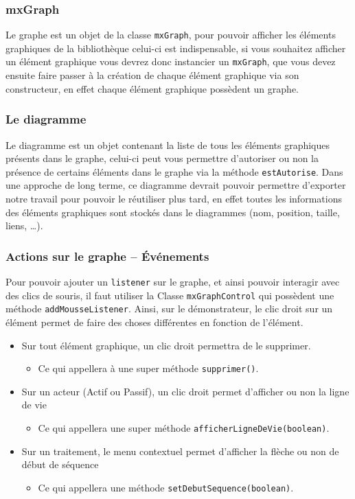 \documentclass[12pt,a4paper,openany]{report}
\begin{document}
	\subsubsection{mxGraph}
	Le graphe est un objet de la classe \texttt{mxGraph}, pour pouvoir afficher les éléments graphiques de la bibliothèque 
	celui-ci est indispensable, si vous souhaitez afficher un élément graphique vous devrez donc instancier 
	un \texttt{mxGraph}, que vous devez ensuite faire passer à la création de chaque élément graphique via son constructeur, 
	en effet chaque élément graphique possèdent un graphe.

	\subsubsection{Le diagramme}
	Le diagramme est un objet contenant la liste de tous les éléments graphiques présents dans le graphe, celui-ci peut vous permettre
	d'autoriser ou non la présence de certains éléments dans le graphe via la méthode \texttt{estAutorise}. Dans une approche de long
	terme, ce diagramme devrait pouvoir permettre d'exporter notre travail pour pouvoir le réutiliser plus tard, 
	en effet toutes les informations des éléments graphiques sont stockés dans le diagrammes (nom, position, taille, liens, \ldots).

	\subsubsection{Actions sur le graphe -- Événements}
	Pour pouvoir ajouter un \texttt{listener} sur le graphe, et ainsi pouvoir interagir avec des clics de souris, 
	il faut utiliser la Classe \texttt{mxGraphControl} qui possèdent une méthode \texttt{addMousseListener}.
	Ainsi, sur le démonstrateur, le clic droit sur un élément permet de faire des choses différentes en fonction de l'élément. \\
	\begin{itemize}
		\item Sur tout élément graphique, un clic droit permettra de le supprimer.
			\begin{itemize}
				\item Ce qui appellera à une super méthode \texttt{supprimer()}.
			\end{itemize}
		\item Sur un acteur (Actif ou Passif), un clic droit permet d'afficher ou non la ligne de vie
			\begin{itemize}
				\item Ce qui appellera une super méthode \texttt{afficherLigneDeVie(boolean)}.
			\end{itemize}
		\item Sur un traitement, le menu contextuel permet d'afficher la flèche ou non de début de séquence
			\begin{itemize}
				\item Ce qui appellera une méthode \texttt{setDebutSequence(boolean)}.
			\end{itemize}
	\end{itemize}
\end{document}
